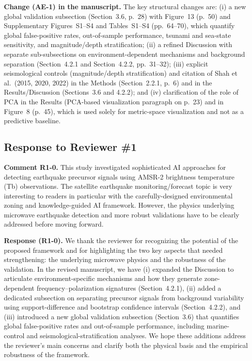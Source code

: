 \documentclass[12pt]{article}
\newcommand{\revcomment}[1]{\begingroup\color{commentcolor}#1\endgroup}
\newcommand{\revresponse}[1]{\begingroup\color{responsecolor}#1\endgroup}
\newcommand{\revchange}[1]{\begingroup\color{changecolor}#1\endgroup}
\begin{document}
\revchange{%
\textbf{Change (AE-1) in the manuscript.}
The key structural changes are: (i) a new global validation subsection (Section~3.6, p.~28) with Figure~13 (p.~50) and Supplementary Figures~S1--S4 and Tables~S1--S4 (pp.~64--70), which quantify global false-positive rates, out-of-sample performance, tsunami and sea-state sensitivity, and magnitude/depth stratification; (ii) a refined Discussion with separate sub-subsections on environment-dependent mechanisms and background separation (Section~4.2.1 and Section~4.2.2, pp.~31--32); (iii) explicit seismological controls (magnitude/depth stratification) and citation of Shah et al.~(2015, 2020, 2022) in the Methods (Section~2.2.1, p.~6) and in the Results/Discussion (Sections~3.6 and 4.2.2); and (iv) clarification of the role of PCA in the Results (PCA-based visualization paragraph on p.~23) and in Figure~8 (p.~45), which is used solely for metric-space visualization and not as a predictive baseline.}

\subsection*{Response to Reviewer \#1}

\revcomment{%
\textbf{Comment R1-0.} This study investigated sophisticated AI approaches for detecting earthquake precursor signals using AMSR-2 brightness temperature (Tb) observations. The satellite earthquake monitoring/forecast topic is very interesting to readers in particular with the carefully-designed environmental zoning and knowledge-guided AI framework. However, the physics underlying microwave earthquake detection and more robust validations have to be clearly addressed before moving forward.
}

\revresponse{%
\textbf{Response (R1-0).} We thank the reviewer for recognizing the potential of the proposed framework and for highlighting the two key aspects that needed strengthening: the underlying microwave physics and the robustness of the validation. In the revised manuscript, we have (i) expanded the Discussion to articulate environment-specific mechanisms and how they generate zone-dependent frequency--polarization signatures (Section~4.2.1), (ii) added a dedicated subsection on separating precursor signals from background variability using support-difference and bootstrap confidence intervals (Section~4.2.2), and (iii) introduced a new global validation subsection (Section~3.6) that quantifies global false-positive rates and out-of-sample performance, including marine-control and seismological-stratification analyses. We hope these additions address the reviewer’s main concerns and clarify both the physical basis and the empirical robustness of the framework.
}
\end{document}
